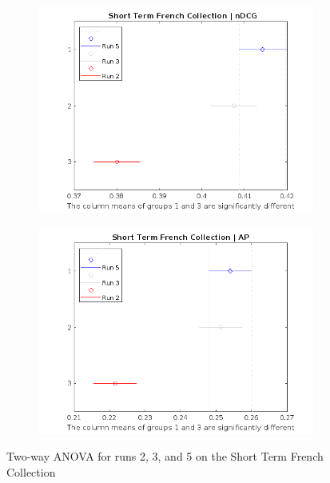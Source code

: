 \begin{figure}[!h]
    \centering
    \begin{subfigure}[b]{0.49\textwidth}
        \centering
        \includegraphics[width=\textwidth]{figure/StatisticalAnalysis/ANOVA 2/ndcg-st-fr.jpeg}
        \label{fig:st_anova_french_ndcg}
    \end{subfigure}
    \hfill
    \begin{subfigure}[b]{0.49\textwidth}
        \centering
        \includegraphics[width=\textwidth]{figure/StatisticalAnalysis/ANOVA 2/ap-st-fr.jpeg}
        \label{fig:st_anova_french_ap}
    \end{subfigure}
    \caption{Two-way \ac{ANOVA} for runs 2, 3, and 5 on the Short Term French Collection}
    \label{fig:st_anova_french}
\end{figure}

